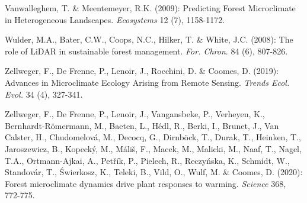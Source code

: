 \documentclass[5p]{elsarticle} %
\newlength{\cslhangindent}
\newlength{\cslentryspacingunit} %
\newenvironment{CSLReferences}[2] %
 {%
  \setlength{\parindent}{0pt}
  \ifodd #1
  \let\oldpar\par
  \def\par{\hangindent=\cslhangindent\oldpar}
  \fi
  \setlength{\parskip}{#2\cslentryspacingunit}
 }%
 {}
\begin{document}
\begin{CSLReferences}{1}{0}
Vanwalleghem, T. \& Meentemeyer, R.K. (2009): Predicting Forest Microclimate in Heterogeneous Landscapes. \emph{Ecosystems} 12 (7), 1158-1172.

Wulder, M.A., Bater, C.W., Coops, N.C., Hilker, T. \& White, J.C. (2008): The role of LiDAR in sustainable forest management. \emph{For. Chron}. 84 (6), 807-826.

Zellweger, F., De Frenne, P., Lenoir, J., Rocchini, D. \& Coomes, D. (2019): Advances in Microclimate Ecology Arising from Remote Sensing. \emph{Trends Ecol. Evol.} 34 (4), 327-341.

Zellweger, F., De Frenne, P., Lenoir, J., Vangansbeke, P., Verheyen, K., Bernhardt-Römermann, M., Baeten, L., Hédl, R., Berki, I., Brunet, J., Van Calster, H., Chudomelová, M., Decocq, G., Dirnböck, T., Durak, T., Heinken, T., Jaroszewicz, B., Kopecký, M., Máliš, F., Macek, M., Malicki, M., Naaf, T., Nagel, T.A., Ortmann-Ajkai, A., Petřík, P., Pielech, R., Reczyńska, K., Schmidt, W., Standovár, T., Świerkosz, K., Teleki, B., Vild, O., Wulf, M. \& Coomes, D. (2020): Forest microclimate dynamics drive plant responses to warming. \emph{Science} 368, 772-775.


\end{CSLReferences}
\end{document}
